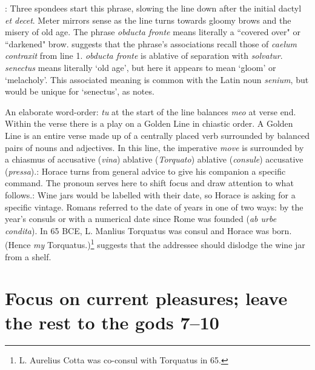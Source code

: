 
: Three spondees start this phrase, slowing the line down after the initial dactyl \textit{et decet}.  Meter mirrors sense as the line turns towards gloomy brows and the misery of old age.  The phrase \textit{obducta fronte} means literally a ``covered over" or ``darkened" brow.  \citet[217]{mankin1995} suggests that the phrase's associations recall those of \textit{caelum contraxit} from line 1.  \textit{obducta fronte} is ablative of separation with \textit{solvatur}.  \textit{senectus} means literally `old age', but here it appears to mean `gloom' or `melacholy'.  This associated meaning is common with the Latin noun \textit{senium}, but would be unique for `senectus', as \citet[217]{mankin1995} notes.


An elaborate word-order: \textit{tu} at the start of the line balances \textit{meo} at verse end. Within the verse there is a play on a Golden Line in chiastic order.  A Golden Line is an entire verse made up of a centrally placed verb surrounded by balanced pairs of nouns and adjectives.  In this line, the imperative \textit{move} is surrounded by a chiasmus of accusative (\textit{vina}) ablative (\textit{Torquato}) ablative (\textit{consule}) accusative (\textit{pressa}).\indent{}: Horace turns from general advice to give his companion a specific command.  The pronoun serves here to shift focus and draw attention to what follows.\indent{}: Wine jars would be labelled with their date, so Horace is asking for a specific vintage.  Romans referred to the date of years in one of two ways: by the year's consuls or with a numerical date since Rome was founded (\textit{ab urbe condita}).  In 65 BCE, L. Manlius Torquatus was consul and Horace was born.  (Hence \textit{my} Torquatus.)\footnote{L. Aurelius Cotta was co-consul with Torquatus in 65.}\indent{} suggests that the addressee should dislodge the wine jar from a shelf.


\section*{Focus on current pleasures; leave the rest to the gods 7--10}


